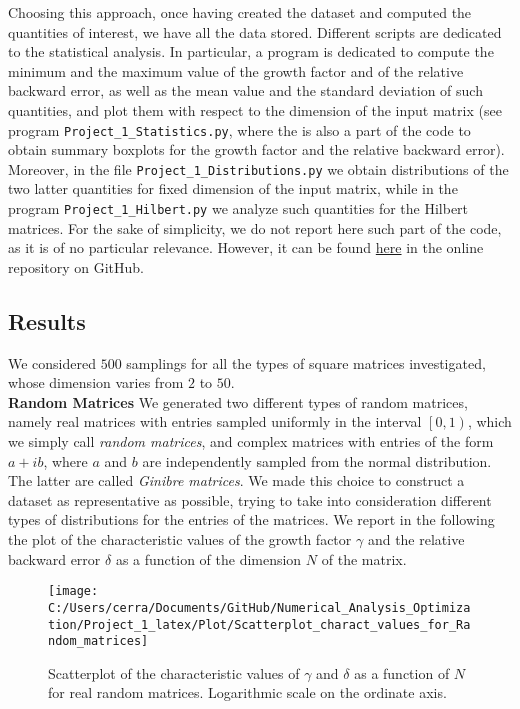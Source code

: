 \documentclass[a4paper,11pt]{article}
\begin{document}
\noindent Choosing this approach, once having created the dataset and computed the quantities of interest, we have all the data stored. Different scripts are dedicated to the statistical analysis. In particular, a program is dedicated to compute the minimum and the maximum value of the growth factor and of the relative backward error, as well as the mean value and the standard deviation of such quantities, and plot them with respect to the dimension of the input matrix (see program \texttt{Project_1_Statistics.py}, where the is also a part of the code to obtain summary boxplots for the growth factor and the relative backward error). Moreover, in the file \texttt{Project_1_Distributions.py} we obtain distributions of the two latter quantities for fixed dimension of the input matrix, while in the program \texttt{Project_1_Hilbert.py} we analyze such quantities for the Hilbert matrices. For the sake of simplicity, we do not report here such part of the code, as it is of no particular relevance. However, it can be found \href{https://github.com/nunziacerrato/Numerical_Analysis_Optimization/blob/main/Project_1/Statistics_Project_1.py}{here} in the online repository on GitHub.

\subsection{Results}
We considered $500$ samplings for all the types of square matrices investigated, whose dimension varies from $2$ to $50$.\\

\noindent \textbf{Random Matrices } We generated two different types of random matrices, namely real matrices with entries sampled uniformly in the interval $\left[0,1\right)$, which we simply call \textit{random matrices}, and complex matrices with entries of the form $a+ib$, where $a$ and $b$ are independently sampled from the normal distribution. The latter are called \textit{Ginibre matrices}. We made this choice to construct a dataset as representative as possible, trying to take into consideration different types of distributions for the entries of the matrices. We report in the following the plot of the characteristic values of the growth factor $\gamma$ and the relative backward error $\delta$ as a function of the dimension $N$ of the matrix.

\begin{figure}[H]
	\centering
	\texttt{[image: C:/Users/cerra/Documents/GitHub/Numerical\_Analysis\_Optimization/Project\_1\_latex/Plot/Scatterplot\_charact\_values\_for\_Random\_matrices]}
	\caption{Scatterplot of the characteristic values of $\gamma$ and $\delta$ as a function of $N$ for real random matrices. Logarithmic scale on the ordinate axis.}
	\label{fig:Scatterplot_Random}
\end{figure}
\end{document}
